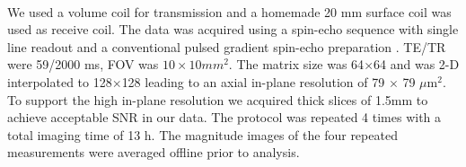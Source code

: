 \paragraph{}
We used a volume coil for transmission and a homemade 20 mm surface coil was used as receive coil. The data was acquired using a spin-echo sequence with single line readout and a conventional pulsed gradient spin-echo preparation \citep{Stejskal:1965}.  TE/TR were 59/2000 ms, \gls{FOV} was $10\times 10 mm^2$. The matrix size was 64$\times$64 and was 2-D interpolated to 128$\times$128 leading to an axial in-plane resolution of 79 $\times$ 79 $\mu$m$^2$. To support the high in-plane resolution we acquired thick slices of 1.5mm to achieve acceptable \gls{SNR} in our data. The protocol was repeated 4 times with a total imaging time of 13 h. The magnitude images of the four repeated measurements were averaged offline prior to analysis.
